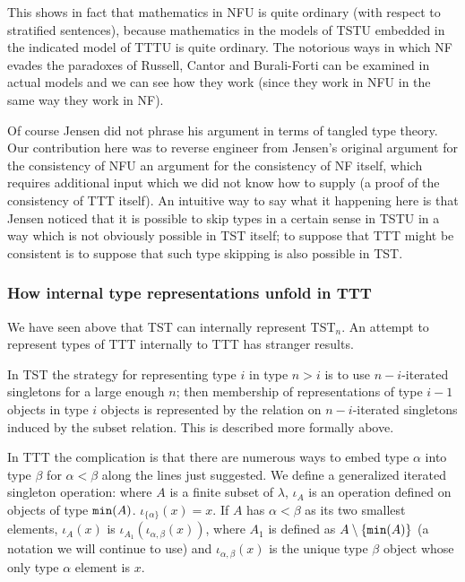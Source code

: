 \documentclass[12pt]{article}
\begin{document}
\begin{description}
This shows in fact that mathematics in NFU is quite ordinary (with respect to stratified sentences), because mathematics in the models of TSTU embedded in the indicated model of TTTU is quite ordinary.  The notorious ways in which NF evades the paradoxes of Russell, Cantor and Burali-Forti can be examined in actual models and we can see how they work (since they work in NFU in the same way they work in NF).

\end{description}

Of course Jensen did not phrase his argument in terms of tangled type theory.  Our contribution here was to reverse engineer from Jensen's original argument for the consistency of NFU an argument for the consistency of NF itself, which requires additional input which we did not know how to supply (a proof of the consistency of TTT itself).  An intuitive way to say what it happening here is that Jensen noticed that it is possible to skip types in a certain sense in TSTU in a way which is not obviously possible in TST itself;  to suppose that TTT might be consistent is to suppose that such type skipping is also possible in TST.

\subsubsection{How internal type representations unfold in TTT}

We have seen above that TST can internally represent TST$_n$.   An attempt to represent types of TTT internally to TTT has stranger results.

In TST the strategy for representing type $i$ in type $n>i$  is to use $n-i$-iterated singletons for a large enough $n$;  then membership of representations of type $i-1$ objects in type
$i$ objects is represented by the relation on $n-i$-iterated singletons induced by the subset relation.  This is described more formally above.

In TTT the complication is that there are numerous ways to embed type $\alpha$ into type $\beta$ for $\alpha<\beta$ along the lines just suggested.    We define a generalized
iterated singleton operation:  where $A$ is a finite subset of $\lambda$, $\iota_A$ is an operation defined on objects of type ${\tt min}(A)$.  $\iota_{\{\alpha\}}(x)=x$.
If $A$ has $\alpha<\beta$ as its two smallest elements, $\iota_A(x)$ is  $\iota_{A_1}(\iota_{\alpha,\beta}(x))$, where $A_1$ is defined as $A \setminus \{{\tt min}(A)\}$ (a notation we will continue to use) and $\iota_{\alpha,\beta}(x)$ is the unique type $\beta$ object whose only type $\alpha$ element is $x$.
\end{document}
